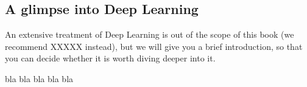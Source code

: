


\subsection{A glimpse into Deep Learning} 

An extensive treatment of Deep Learning is out of the scope of this book (we recommend XXXXX instead), but we will give you a brief introduction, so that you can decide whether it is worth diving deeper into it.

bla
bla
bla
bla
bla

